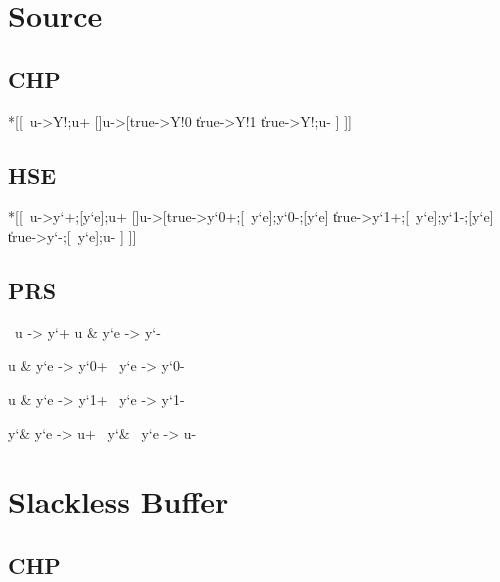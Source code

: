 \documentclass{article}
\begin{document}

\section{Source}

\subsection*{CHP}

\begin{csp}
*[[~u->Y!\phi;u+
  []u->[true->Y!0
         \|true->Y!1
         \|true->Y!\neg\phi;u-
         ]
 ]]
\end{csp}

\subsection*{HSE}

\begin{hse}
*[[~u->y`\phi+;[y`e];u+
  []u->[true->y`0+;[~y`e];y`0-;[y`e]
         \|true->y`1+;[~y`e];y`1-;[y`e]
         \|true->y`\phi-;[~y`e];u-
         ]
 ]]
\end{hse}

\subsection*{PRS}

\begin{prs2}
~u -> y`\phi+
u & y`e -> y`\phi-
\end{prs2}

\begin{prs2}
u & y`e -> y`0+
~y`e -> y`0-

u & y`e -> y`1+
~y`e -> y`1-
\end{prs2}

\begin{prs2}
y`\phi & y`e -> u+
~y`\phi & ~y`e -> u-
\end{prs2}

\section{Slackless Buffer}

\subsection*{CHP}
\end{document}
